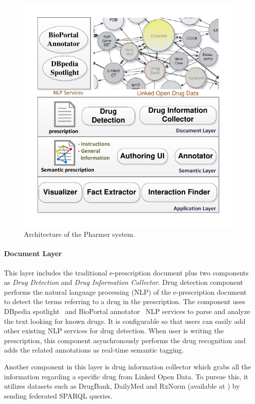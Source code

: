 \documentclass[conference]{IEEEtran}
\begin{document}
\begin{figure}[tb]
	\centering
		\includegraphics[width=1\columnwidth]{images/architecture.pdf}
	\caption{Architecture of the Pharmer system.}
	\label{fig:arch}
\end{figure}

\paragraph{Document Layer} This layer includes the traditional e-prescription document plus two components as \emph{Drug Detection} and \emph{Drug Information Collector}.
Drug detection component performs the natural language processing (NLP) of the e-prescription document to detect the terms referring to a drug in the prescription.
The component uses DBpedia spotlight~\cite{dbspotlight} and BioPortal annotator~\cite{bioportal} NLP services to parse and analyze the text looking for known drugs.
It is configurable so that users can easily add other existing NLP services for drug detection.
When user is writing the prescription, this component asynchronously performs the drug recognition and adds the related annotations as real-time semantic tagging.

Another component in this layer is drug information collector which grabs all the information regarding a specific drug from Linked Open Data.
To pursue this, it utilizes datasets such as DrugBank, DailyMed and RxNorm (available at \cite{lodd}) by sending federated SPARQL queries.
\end{document}
